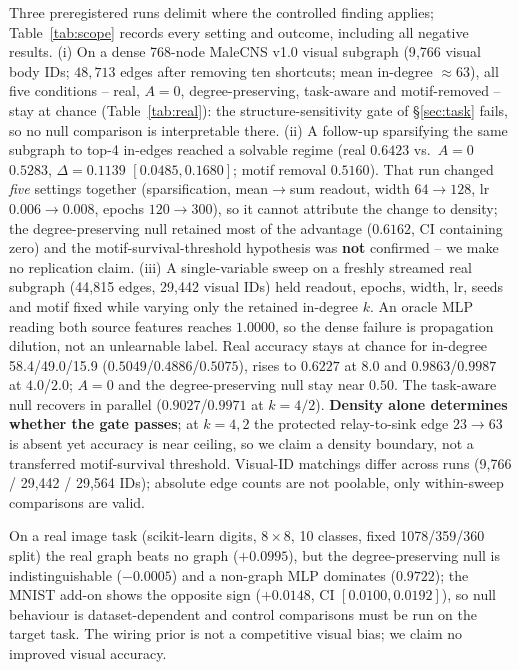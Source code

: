 \documentclass[10pt,twocolumn,letterpaper]{article}
\begin{document}
Three preregistered runs delimit where the controlled finding applies;
Table~\ref{tab:scope} records every setting and outcome, including all
negative results. (i) On a dense 768-node MaleCNS v1.0 visual subgraph
(9{,}766 visual body IDs; $48{,}713$ edges after removing ten shortcuts;
mean in-degree $\approx\!63$), all five conditions -- real, $A\!=\!0$,
degree-preserving, task-aware and motif-removed -- stay at chance
(Table~\ref{tab:real}): the structure-sensitivity gate of
\S\ref{sec:task} fails, so no null comparison is interpretable there.
(ii) A follow-up sparsifying the same subgraph to top-4 in-edges reached a
solvable regime (real $0.6423$ vs.\ $A\!=\!0$ $0.5283$, $\Delta=0.1139$
$[0.0485,0.1680]$; motif removal $0.5160$). That run changed \emph{five}
settings together (sparsification, mean$\to$sum readout, width $64\!\to\!128$,
lr $0.006\!\to\!0.008$, epochs $120\!\to\!300$), so it cannot attribute the
change to density; the degree-preserving null retained most of the advantage
($0.6162$, CI containing zero) and the motif-survival-threshold hypothesis
was \textbf{not} confirmed -- we make no replication claim. (iii) A
single-variable sweep on a freshly streamed real subgraph (44{,}815 edges,
29{,}442 visual IDs) held readout, epochs, width, lr, seeds and motif fixed
while varying only the retained in-degree $k$. An oracle MLP reading both
source features reaches $1.0000$, so the dense failure is propagation
dilution, not an unlearnable label. Real accuracy stays at chance for
in-degree 58.4/49.0/15.9 ($0.5049$/$0.4886$/$0.5075$), rises to $0.6227$ at
$8.0$ and $0.9863$/$0.9987$ at $4.0$/$2.0$; $A\!=\!0$ and the
degree-preserving null stay near $0.50$. The task-aware null recovers in
parallel ($0.9027$/$0.9971$ at $k\!=\!4/2$). \textbf{Density alone determines
whether the gate passes}; at $k\!=\!4,2$ the protected relay-to-sink edge
$23\!\to\!63$ is absent yet accuracy is near ceiling, so we claim a density
boundary, not a transferred motif-survival threshold. Visual-ID matchings
differ across runs (9{,}766 / 29{,}442 / 29{,}564 IDs); absolute edge counts
are not poolable, only within-sweep comparisons are valid.

On a real image task (scikit-learn digits, $8\times8$, 10 classes, fixed
1078/359/360 split) the real graph beats no graph ($+0.0995$), but the
degree-preserving null is indistinguishable ($-0.0005$) and a non-graph MLP
dominates ($0.9722$); the MNIST add-on shows the opposite sign
($+0.0148$, CI $[0.0100,0.0192]$), so null behaviour is dataset-dependent
and control comparisons must be run on the target task. The wiring prior is
not a competitive visual bias; we claim no improved visual accuracy.
\end{document}
